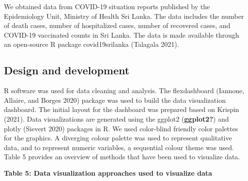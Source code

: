 \documentclass[
]{article}
\begin{document}
We obtained data from COVID-19 situation reports published by the
Epidemiology Unit, Ministry of Health Sri Lanka. The data includes the
number of death cases, number of hospitalized cases, number of recovered
cases, and COVID-19 vaccinated counts in Sri Lanka. The data is made
available through an open-source R package covid19srilanka (Talagala
2021).

\hypertarget{design-and-development}{%
\subsection{Design and development}\label{design-and-development}}

R software was used for data cleaning and analysis. The flexdashboard
(Iannone, Allaire, and Borges 2020) package was used to build the data
visualization dashboard. The initial layout for the dashboard was
prepared based on Krispin (2021). Data visualizations are generated
using the ggplot2 (\textbf{ggplot2?}) and plotly (Sievert 2020) packages
in R. We used color-blind friendly color palettes for the graphics. A
diverging colour palette was used to represent qualitative data, and to
represent numeric variables, a sequential colour theme was used. Table 5
provides an overview of methods that have been used to visualize data.

\textbf{Table 5: Data visualization approaches used to visualize data}
\end{document}
